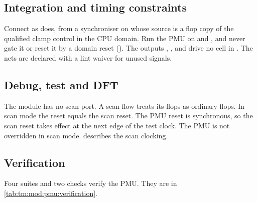 \subsection{Integration and timing constraints}
Connect  as  does, from a synchroniser on  whose source is a flop copy of the qualified clamp control in the CPU domain. Run the PMU on  and , and never gate it or reset it by a domain reset (). The outputs , ,  and  drive no cell in . The nets are declared with a lint waiver for unused signals.

\subsection{Debug, test and DFT}
The module has no scan port. A scan flow treats its flops as ordinary flops. In scan mode the reset  equals the scan reset. The PMU reset is synchronous, so the scan reset takes effect at the next edge of the test clock. The PMU is not overridden in scan mode.  describes the scan clocking.

\subsection{Verification}
Four suites and two checks verify the PMU. They are in \cref{tab:tm:mod:pmu:verification}.


